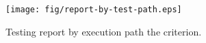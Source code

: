 
\begin{figure}[!ht]
\begin{center}
\texttt{[image: fig/report-by-test-path.eps]}
\caption{\label{fig:report-by-test-path} Testing report by
execution path \wrt the  criterion.}
\end{center}
\end{figure}
